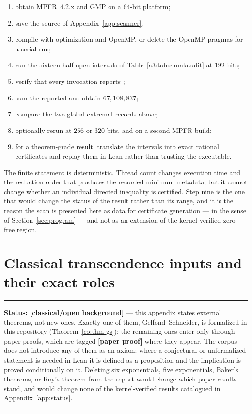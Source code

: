 \documentclass[11pt,oneside]{article}
\theoremstyle{definition}
\theoremstyle{remark}
\newcommand{\lean}[1]{\texttt{\detokenize{#1}}}
\newcommand{\statusnew}{\textcolor{newgreen}{\textbf{[paper proof]}}}
\newcommand{\statusknown}{\textcolor{classicalgray}{\textbf{[classical/open background]}}}
\newenvironment{statusbox}[1]
{\begin{center}\begin{minipage}{0.94\textwidth}\raggedright\hbadness=10000\hrule
\vspace{0.45em}\textbf{Status:} #1\par\vspace{0.35em}}
{\vspace{0.35em}\hrule\end{minipage}\end{center}}
\begin{document}
\begin{enumerate}
\item obtain MPFR~4.2.x and GMP on a $64$-bit platform;
\item save the source of Appendix~\ref{app:scanner};
\item compile with optimization and OpenMP, or delete the OpenMP pragmas for a serial run;
\item run the sixteen half-open intervals of Table~\ref{a3:tab:chunkaudit} at $192$ bits;
\item verify that every invocation reports \lean{failures=0};
\item sum the reported \lean{checked_nonpowers} and obtain $67{,}108{,}837$;
\item compare the two global extremal records above;
\item optionally rerun at $256$ or $320$ bits, and on a second MPFR build;
\item for a theorem-grade result, translate the intervals into exact rational certificates and
replay them in Lean rather than trusting the executable.
\end{enumerate}

The finite statement is deterministic.  Thread count changes execution time and the reduction
order that produces the recorded minimum metadata, but it cannot change whether an individual
directed inequality is certified.  Step nine is the one that would change the status of the
result rather than its range, and it is the reason the scan is presented here as data for
certificate generation --- in the sense of Section~\ref{sec:program} --- and not as an
extension of the kernel-verified zero-free region.

\section{Classical transcendence inputs and their exact roles}\label{app:classical}

\begin{statusbox}{\statusknown{} --- this appendix states external theorems, not new ones.
Exactly one of them, Gelfond--Schneider, is formalized in this repository
(Theorem~\ref{co:thm-gs}); the remaining ones enter only through paper proofs, which are
tagged \statusnew{} where they appear.  The corpus does not introduce any of them as an
axiom: where a conjectural or unformalized statement is needed in Lean it is defined as a
proposition and the implication is proved conditionally on it.  Deleting six exponentials,
five exponentials, Baker's theorems, or Roy's theorem from the report would change which
paper results stand, and would change none of the kernel-verified results catalogued in
Appendix~\ref{app:status}.}
\end{statusbox}
\end{document}
